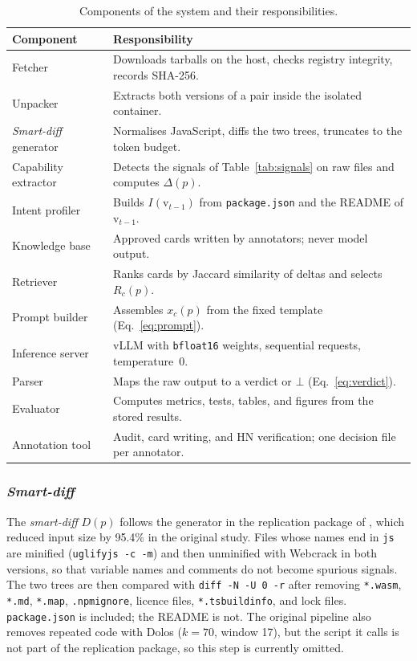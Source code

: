 \documentclass[a4paper,fleqn]{cas-dc}
\begin{document}
\begin{table}[t]
\caption{Components of the system and their responsibilities.}
\label{tab:components}
\small
\begin{tabular}{p{2.3cm} p{5.3cm}}
\hline
Component & Responsibility \\
\hline
Fetcher & Downloads tarballs on the host, checks registry integrity, records SHA-256. \\
Unpacker & Extracts both versions of a pair inside the isolated container. \\
\emph{Smart-diff} generator & Normalises JavaScript, diffs the two trees, truncates to the token budget. \\
Capability extractor & Detects the signals of Table~\ref{tab:signals} on raw files and computes $\Delta(p)$. \\
Intent profiler & Builds $I(\mathrm{v}_{t-1})$ from \texttt{package.json} and the README of $\mathrm{v}_{t-1}$. \\
Knowledge base & Approved cards written by annotators; never model output. \\
Retriever & Ranks cards by Jaccard similarity of deltas and selects $R_c(p)$. \\
Prompt builder & Assembles $x_c(p)$ from the fixed template (Eq.~\ref{eq:prompt}). \\
Inference server & vLLM with \texttt{bfloat16} weights, sequential requests, temperature~0. \\
Parser & Maps the raw output to a verdict or $\bot$ (Eq.~\ref{eq:verdict}). \\
Evaluator & Computes metrics, tests, tables, and figures from the stored results. \\
Annotation tool & Audit, card writing, and HN verification; one decision file per annotator. \\
\hline
\end{tabular}
\end{table}

\subsubsection{\emph{Smart-diff}}\label{sec:smartdiff}

The \emph{smart-diff} $D(p)$ follows the generator in the replication package
of \citet{wyss2025evaluating}, which reduced input size by 95.4\% in the
original study. Files whose names end in \texttt{js} are minified
(\texttt{uglifyjs -c -m}) and then unminified with Webcrack in both versions,
so that variable names and comments do not become spurious signals. The two
trees are then compared with \texttt{diff -N -U 0 -r} after removing
\texttt{*.wasm}, \texttt{*.md}, \texttt{*.map}, \texttt{.npmignore}, licence
files, \texttt{*.tsbuildinfo}, and lock files. \texttt{package.json} is
included; the README is not. The original pipeline also removes repeated code
with Dolos ($k{=}70$, window 17), but the script it calls is not part of the
replication package, so this step is currently omitted.
\end{document}
